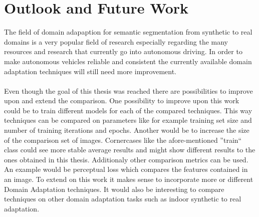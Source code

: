 \section{Outlook and Future Work}

The field of domain adapaption for semantic segmentation from synthetic to real domains is a very popular field of research especially regarding the many resources and research that currently go into autonomous driving. In order to make autonomous vehicles reliable and consistent the currently available domain adaptation techniques will still need more improvement. 

\paragraph{}
Even though the goal of this thesis was reached there are possibilities to improve upon and extend the comparison. One possibility to improve upon this work could be to train different models for each of the compared techniques. This way techniques can be compared on parameters like for example training set size and number of training iterations and epochs. Another would be to increase the size of the comparison set of images. Cornercases like the afore-mentioned ''train`` class could see more stable average results and might show different results to the ones obtained in this thesis. Additionaly other comparison metrics can be used. An example would be perceptual loss which compares the features contained in an image. To extend on this work it makes sense to incorporate more or different Domain Adaptation techniques. It would also be interesting to compare techniques on other domain adaptation tasks such as indoor synthetic to real adaptation. 